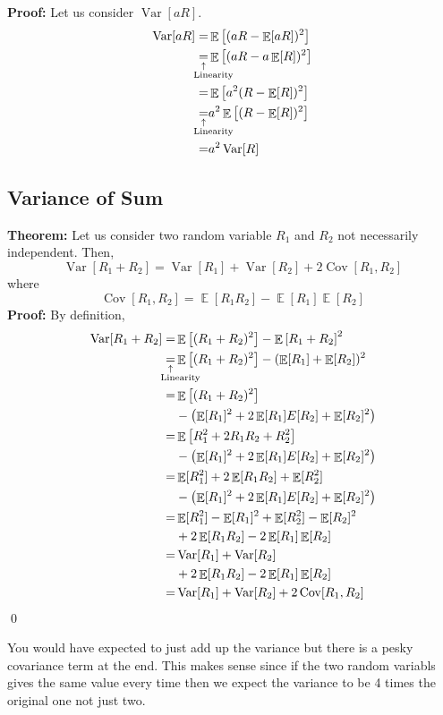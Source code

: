 \documentclass[a4paper, 12pt]{article}
\newcommand{\theorem}{\vspace{1em}\noindent\textbf{Theorem:} }
\renewcommand{\proof}{\vspace{0.5em}\noindent\textbf{Proof:} }
\newcommand{\qedd}{\qed\newline}
\newcommand{\expl}[2]{%
	\underset{\substack{\uparrow\\\mathrlap{\text{\hspace{-1em}#2}}}}{#1}}
\DeclareMathOperator{\E}{\mathbb{E}}
\DeclareMathOperator{\Cov}{Cov}
\DeclareMathOperator{\Var}{Var}
\begin{document}
\begin{multicols}{2}
\proof Let us consider $\Var[aR]$.
\begin{align*}
	\Var[aR] =& \E\left[ (aR - \E[aR])^2 \right]\\
	\expl{=}{Linearity}& \E\left[ (aR - a\E[R])^2 \right]\\
	=& \E\left[ a^2(R - \E[R])^2 \right]\\
	\expl{=}{Linearity}& a^2 \E\left[ (R - \E[R])^2 \right]\\
	=& a^2 \Var[R]
\end{align*}

\subsection*{Variance of Sum}

\theorem Let us consider two random variable $R_1$ and $R_2$ not necessarily independent. Then,
\[
	\Var[R_1 + R_2 ] = \Var[R_1] + \Var[R_2] + 2\Cov[R_1,R_2]
\]
where
\[
	\Cov[R_1,R_2] = \E[R_1 R_2] - \E[R_1]\E[R_2]
\]
\proof By definition,
\begin{align*}
	\Var[R_1 + R_2] =& \E\left[(R_1 + R_2)^2 \right] -  \E\left[R_1 + R_2 \right]^2\\
	\expl{=}{Linearity}& \E\left[(R_1 + R_2)^2 \right] -  (\E[R_1] + \E[R_2])^2\\
	=& \E\left[(R_1 + R_2)^2 \right] \\
	&-\left(\E[R_1]^2 + 2\E[R_1]E[R_2] +\E[R_2]^2 \right)\\
	=& \E\left[R_1^2 + 2 R_1 R_2 + R_2^2 \right] \\
	&-\left(\E[R_1]^2 + 2\E[R_1]E[R_2] +\E[R_2]^2 \right)\\
	=& \E[R_1^2] + 2\E[R_1 R_2] + \E[R_2^2] \\
	&-\left(\E[R_1]^2 + 2\E[R_1]E[R_2] +\E[R_2]^2 \right)\\
	=& \E[R_1^2] - \E[R_1]^2 + \E[R_2^2] - \E[R_2]^2\\
	&+ 2\E[R_1 R_2] - 2\E[R_1]\E[R_2]\\
	=& \Var[R_1] + \Var[R_2] \\
	& + 2\E[R_1 R_2] - 2\E[R_1]\E[R_2]\\
	=& \Var[R_1] + \Var[R_2] + 2\Cov[R_1,R_2]
\end{align*}
\qedd

You would have expected to just add up the variance but there is a pesky covariance term at the end. This makes sense since if the two random variabls gives the same value every time then we expect the variance to be 4 times the original one not just two.


\end{multicols}
\end{document}
